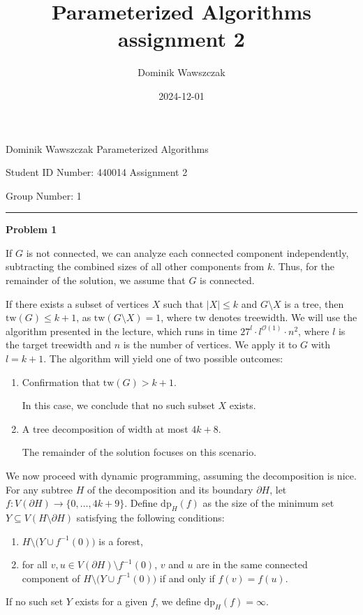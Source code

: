 \documentclass[12pt]{article}
\title{Parameterized Algorithms assignment 2}
\author{Dominik Wawszczak}
\date{2024-12-01}
\begin{document}
	\setlength{\parindent}{0 cm}
	
	Dominik Wawszczak \hfill Parameterized Algorithms
	
	Student ID Number: 440014 \hfill Assignment 2
	
	Group Number: 1
	
	\bigskip
	\hrule
	\bigskip
	
	\textbf{Problem 1}
	
	\medskip
	
	If \(G\) is not connected, we can analyze each connected component
	independently, subtracting the combined sizes of all other components from
	\(k\). Thus, for the remainder of the solution, we assume that \(G\) is
	connected.
	
	\medskip
	
	If there exists a subset of vertices \(X\) such that \(|X| \leqslant k\) and
	\(G \setminus X\) is a tree, then \(\text{tw}(G) \leqslant k + 1\), as
	\(\text{tw}(G \setminus X) = 1\), where \(\text{tw}\) denotes treewidth. We
	will use the algorithm presented in the lecture, which runs in time \(27^{l}
	\cdot l^{\mathcal{O}(1)} \cdot n^{2}\), where \(l\) is the target treewidth
	and \(n\) is the number of vertices. We apply it to \(G\) with \(l = k +
	1\). The algorithm will yield one of two possible outcomes:
	\begin{enumerate}
		\item Confirmation that \(\text{tw}(G) > k + 1\).
		      
		      In this case, we conclude that no such subset \(X\) exists.
		
		\item A tree decomposition of width at most \(4k + 8\).
		      
		      The remainder of the solution focuses on this scenario.
	\end{enumerate}
	
	\medskip
	
	We now proceed with dynamic programming, assuming the decomposition is nice.
	For any subtree \(H\) of the decomposition and its boundary \(\partial H\),
	let \(f : V(\partial H) \to \{0, \ldots, 4k + 9\}\). Define
	\(\text{dp}_{H}(f)\) as the size of the minimum set \(Y \subseteq
	V(H \setminus \partial H)\) satisfying the following conditions:
	\begin{enumerate}
		\item \(H \setminus \big( Y \cup f^{-1}(0) \big)\) is a forest,
		\item for all \(v, u \in V(\partial H) \setminus f^{-1}(0)\), \(v\) and
		\(u\) are in the same connected component of \(H \setminus \big( Y \cup
		f^{-1}(0) \big)\) if and only if \(f(v) = f(u)\).
	\end{enumerate}
	If no such set \(Y\) exists for a given \(f\), we define \(\text{dp}_{H}(f)
	= \infty\).
	
\end{document}
